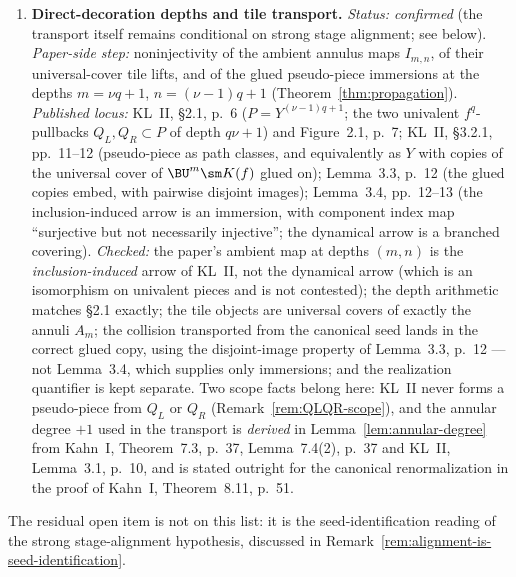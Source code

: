 \begin{remark}
\begin{enumerate}
shows, the set-theoretic equalizer need not be the pullback in the
category of complex \(1\)-manifolds) is regenerated at each stage by
Proposition~\ref{prop:base-change}(6) and independently by Kahn~I,
Lemma~7.7, p.~40 and Lemma~7.9, p.~40.
\item \textbf{Direct-decoration depths and tile transport.}
\emph{Status: confirmed} (the transport itself remains conditional on
strong stage alignment; see below).
\emph{Paper-side step:} noninjectivity of the ambient annulus maps
\(I_{m,n}\), of their universal-cover tile lifts, and of the glued
pseudo-piece immersions at the depths \(m=\nu q+1\),
\(n=(\nu-1)q+1\) (Theorem~\ref{thm:propagation}).
\emph{Published locus:} KL~II, \S2.1, p.~6 (\(P=Y^{(\nu-1)q+1}\); the
two univalent \(f^q\)-pullbacks \(Q_L,Q_R\subset P\) of depth
\(q\nu+1\)) and Figure~2.1, p.~7; KL~II, \S3.2.1, pp.~11--12
(pseudo-piece as path classes, and equivalently as \(Y\) with copies
of the universal cover of \(\BU^m\sm K(f)\) glued on);
Lemma~3.3, p.~12 (the glued copies embed, with pairwise disjoint
images); Lemma~3.4, pp.~12--13 (the inclusion-induced arrow is an
immersion, with component index map ``surjective but not necessarily
injective''; the dynamical arrow is a branched covering).
\emph{Checked:} the paper's ambient map at depths \((m,n)\) is the
\emph{inclusion-induced} arrow of KL~II, not the dynamical arrow (which
is an isomorphism on univalent pieces and is not contested); the depth
arithmetic matches \S2.1 exactly; the tile objects are universal covers
of exactly the annuli \(A_m\); the collision transported from the
canonical seed lands in the correct glued copy, using the
disjoint-image property of Lemma~3.3, p.~12 --- not Lemma~3.4, which
supplies only immersions; and the realization quantifier is kept
separate.  Two scope facts belong here: KL~II never forms a
pseudo-piece from \(Q_L\) or \(Q_R\)
(Remark~\ref{rem:QLQR-scope}), and the annular degree \(+1\) used in
the transport is \emph{derived} in Lemma~\ref{lem:annular-degree} from
Kahn~I, Theorem~7.3, p.~37, Lemma~7.4(2), p.~37 and KL~II, Lemma~3.1,
p.~10, and is stated outright for the canonical renormalization in the
proof of Kahn~I, Theorem~8.11, p.~51.
\end{enumerate}
The residual open item is not on this list: it is the
seed-identification reading of the strong stage-alignment hypothesis,
discussed in Remark~\ref{rem:alignment-is-seed-identification}.
\end{remark}

